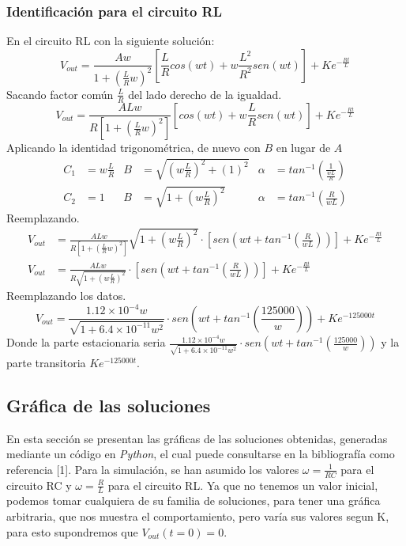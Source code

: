 \documentclass{article}
\begin{document}
\subsubsection{Identificación para el circuito RL}
En el circuito RL con la siguiente solución:
\[
    V_{out}=\frac{Aw}{1+(\frac{L}{R}w)^2}[\frac{L}{R}cos(wt)+w\frac{L^2}{R^2}sen(wt)]+Ke^{-\frac{Rt}{L}}
\]
Sacando factor común \(\frac{L}{R}\) del lado derecho de la igualdad.
\[
        V_{out}=\frac{ALw}{R[1+(\frac{L}{R}w)^2]}[cos(wt)+w\frac{L}{R}sen(wt)]+Ke^{-\frac{Rt}{L}}
\]
Aplicando la identidad trigonométrica, de nuevo con \(B\) en lugar de \(A\)
\begin{align*}
    C_1&=w\frac{L}{R}
    &B&=\sqrt{(w\frac{L}{R})^2+(1)^2}
    &\alpha&=tan^{-1}(\frac{1}{\frac{wL}{R}})\\
    C_2&=1
    &B&=\sqrt{1+(w\frac{L}{R})^2}
    &\alpha&=tan^{-1}(\frac{R}{wL})
\end{align*}
Reemplazando.
\begin{align*}
    V_{out}&=\frac{ALw}{R[1+(\frac{L}{R}w)^2]}\sqrt{1+(w\frac{L}{R})^2}\cdot [sen(wt+tan^{-1}(\frac{R}{wL}))]+Ke^{-\frac{Rt}{L}} \\
    V_{out}&=\frac{ALw}{R\sqrt{1+(w\frac{L}{R})^2}}\cdot [sen(wt+tan^{-1}(\frac{R}{wL}))]+Ke^{-\frac{Rt}{L}}
\end{align*}
Reemplazando los datos.
\[
    V_{out}=\frac{1.12\times 10^{-4}w}{\sqrt{1+6.4\times 10^{-11}w^2}}\cdot sen(wt+tan^{-1}(\frac{125000}{w}))+Ke^{-125000t}
\]
Donde la parte estacionaria seria \(\frac{1.12\times 10^{-4}w}{\sqrt{1+6.4\times 10^{-11}w^2}}\cdot sen(wt+tan^{-1}(\frac{125000}{w}))\) y la parte transitoria \(Ke^{-125000t}\).
\subsection{Gráfica de las soluciones}

En esta sección se presentan las gráficas de las soluciones obtenidas, generadas mediante un código en \textit{Python}, el cual puede consultarse en la bibliografía como referencia [1]. Para la simulación, se han asumido los valores \( \omega = \frac{1}{RC} \) para el circuito RC y \( \omega = \frac{R}{L} \) para el circuito RL. Ya que no tenemos un valor inicial, podemos tomar cualquiera de su familia de soluciones, para tener una gráfica arbitraria, que nos muestra el comportamiento, pero varía sus valores segun K, para esto supondremos que \(V_{out}(t=0)=0\).
\end{document}
